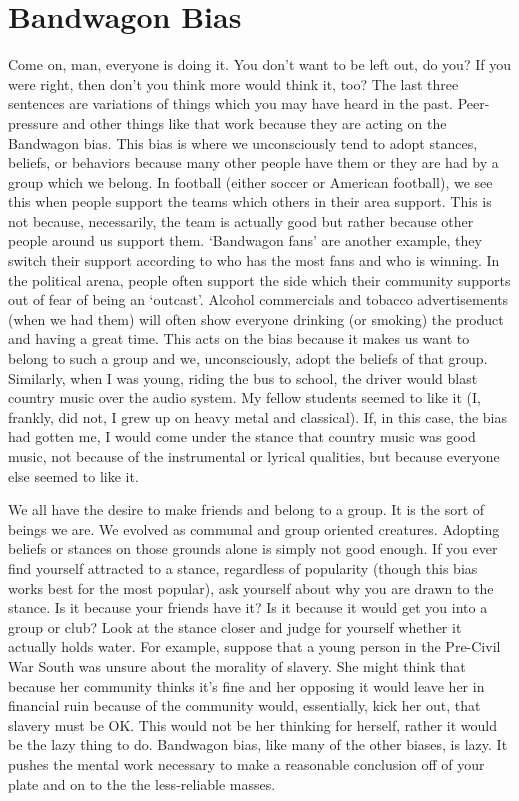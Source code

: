 \section{Bandwagon Bias}

Come on, man, everyone is doing it. You don't want to be left out, do you? If you were right, then don't you think more would think it, too? The last three sentences are variations of things which you may have heard in the past. Peer-pressure and other things like that work because they are acting on the Bandwagon bias. This bias is where we unconsciously tend to adopt stances, beliefs, or behaviors because many other people have them or they are had by a group which we belong.  In football (either soccer or American football), we see this when people support the teams which others in their area support. This is not because, necessarily, the team is actually good but rather because other people around us support them. `Bandwagon fans' are another example, they switch their support according to who has the most fans and who is winning. In the political arena, people often support the side which their community supports out of fear of being an `outcast'. Alcohol commercials and tobacco advertisements (when we had them) will often show everyone drinking (or smoking) the product and having a great time. This acts on the bias because it makes us want to belong to such a group and we, unconsciously, adopt the beliefs of that group. Similarly, when I was young, riding the bus to school, the driver would blast country music over the audio system. My fellow students seemed to like it (I, frankly, did not, I grew up on heavy metal and classical). If, in this case, the bias had gotten me, I would come under the stance that country music was good music, not because of the instrumental or lyrical qualities, but because everyone else seemed to like it.

We all have the desire to make friends and belong to a group. It is the sort of beings we are. We evolved as communal and group oriented creatures. Adopting beliefs or stances on those grounds alone is simply not good enough. If you ever find yourself attracted to a stance, regardless of popularity (though this bias works best for the most popular), ask yourself about why you are drawn to the stance. Is it because your friends have it? Is it because it would get you into a group or club? Look at the stance closer and judge for yourself whether it actually holds water. For example, suppose that a young person in the Pre-Civil War South  was unsure about the morality of slavery. She might think that because her community thinks it's fine and her opposing it would leave her in financial ruin because of the community would, essentially, kick her out, that slavery must be OK.  This would not be her thinking for herself, rather it would be the lazy thing to do. Bandwagon bias, like many of the other biases, is lazy. It pushes the mental work necessary to make a reasonable conclusion off of your plate and on to the the less-reliable masses.
